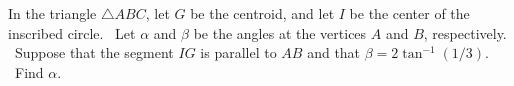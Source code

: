 In the triangle $\triangle ABC$, let $G$ be the centroid, and let $I$ be the center of the inscribed circle.  Let $\alpha$ and $\beta$ be the angles at the vertices $A$ and $B$, respectively.  Suppose that the segment $IG$ is parallel to $AB$ and that $\beta = 2\tan^{-1}(1/3)$.  Find $\alpha$.